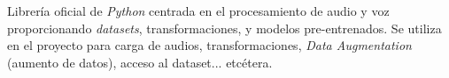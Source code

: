 Librería oficial de \textit{Python} centrada en el procesamiento de audio y voz proporcionando \textit{datasets}, transformaciones, y modelos pre-entrenados. Se utiliza en el proyecto para carga de audios, transformaciones, \textit{Data Augmentation} (aumento de datos), acceso al dataset... etcétera.